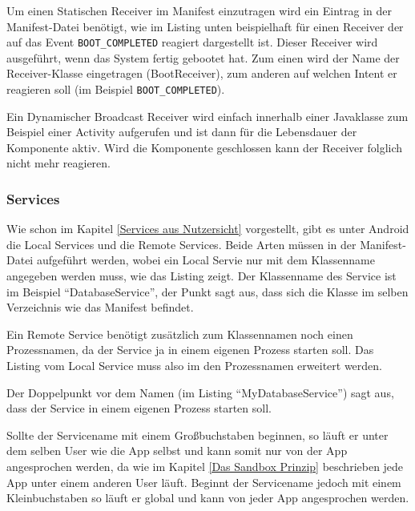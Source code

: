 Um einen Statischen Receiver im Manifest einzutragen wird ein Eintrag in der Manifest-Datei ben\"otigt, wie im Listing unten beispielhaft f\"ur einen Receiver der auf das Event \texttt{BOOT\_COMPLETED} reagiert dargestellt ist. Dieser Receiver wird ausgef\"uhrt, wenn das System fertig gebootet hat. Zum einen wird der Name der Receiver-Klasse eingetragen (BootReceiver), zum anderen auf welchen Intent er reagieren soll (im Beispiel \texttt{BOOT\_COMPLETED}).



Ein Dynamischer Broadcast Receiver wird einfach innerhalb einer Javaklasse zum Beispiel einer Activity aufgerufen und ist dann f\"ur die Lebensdauer der Komponente aktiv. Wird die Komponente geschlossen kann der Receiver folglich nicht mehr reagieren.

\subsubsection{Services} \label{Services}
Wie schon im Kapitel \ref{Services aus Nutzersicht} vorgestellt, gibt es unter Android die Local Services und die Remote Services. Beide Arten m\"ussen in der Manifest-Datei aufgef\"uhrt werden, wobei ein Local Servie nur mit dem Klassenname angegeben werden muss, wie das Listing zeigt. Der Klassenname des Service ist im Beispiel "`DatabaseService"', der Punkt sagt aus, dass sich die Klasse im selben Verzeichnis wie das Manifest befindet.



Ein Remote Service ben\"otigt zus\"atzlich zum Klassennamen noch einen Prozessnamen, da der Service ja in einem eigenen Prozess starten soll. Das Listing vom Local Service muss also im den Prozessnamen erweitert werden.

Der Doppelpunkt vor dem Namen (im Listing "`MyDatabaseService"') sagt aus, dass der Service in einem eigenen Prozess starten soll.

Sollte der Servicename mit einem Gro\ss{}buchstaben beginnen, so l\"auft er unter dem selben User wie die App selbst und kann somit nur von der App angesprochen werden, da wie im Kapitel \ref{Das Sandbox Prinzip} beschrieben jede App unter einem anderen User l\"auft. Beginnt der Servicename jedoch mit einem Kleinbuchstaben so l\"auft er global und kann von jeder App angesprochen werden.



